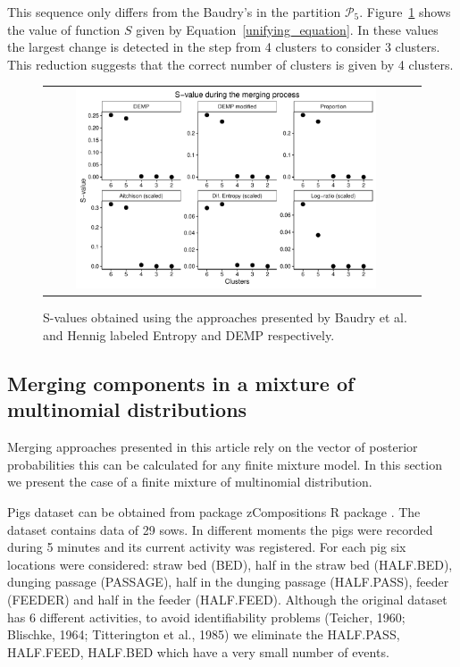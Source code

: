 \documentclass[10pt, a4paper]{article}
\newcommand{\pkg}[1]{{\fontseries{b}\selectfont #1}}
\begin{document}
\begin{spacing}{1.9}
This sequence only differs from the Baudry's in the partition $\mathcal{P}_5$.  Figure~\ref{gaussian_Svalues} shows the value of function $S$ given by Equation~\ref{unifying_equation}. In these values the largest change is detected in the step from 4 clusters to consider 3 clusters. This reduction suggests that the correct number of clusters is given by 4 clusters.
\begin{figure}[t]
\begin{center}
\begin{tabular}{cc}
  \includegraphics[width=0.85\textwidth]{figures/gaussian_Svalues.pdf} \\
 \end{tabular}
 \caption{S-values obtained using the approaches presented by Baudry et al. and Hennig labeled Entropy and DEMP respectively.}\label{gaussian_Svalues}
\end{center}
\end{figure}

\subsection{Merging components in a mixture of multinomial distributions}

Merging approaches presented in this article rely on the vector of posterior probabilities this can be calculated for any finite mixture model. In this section we present the case of a finite mixture of multinomial distribution.

Pigs dataset can be obtained from package \pkg{zCompositions} R package \citep{palarea2012zcompositions}. The dataset contains data of 29 sows. In different moments the pigs were recorded during 5 minutes and its current activity was registered. For each pig six locations were considered: straw bed (BED), half in the straw bed (HALF.BED), dunging passage (PASSAGE), half in the dunging passage (HALF.PASS), feeder (FEEDER) and half in the feeder (HALF.FEED). Although the original dataset has 6 different activities, to avoid identifiability problems (Teicher, 1960; Blischke, 1964; Titterington et al., 1985) we eliminate the HALF.PASS, HALF.FEED, HALF.BED which have a very small number of events.


\end{spacing}
\end{document}

